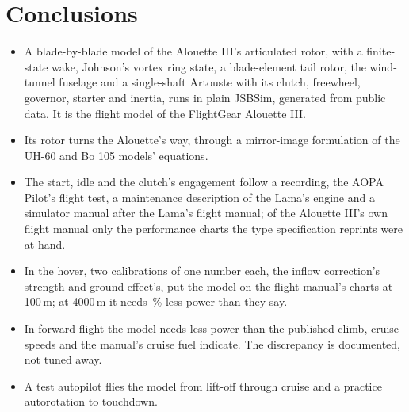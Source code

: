 \documentclass[10pt,a4paper,twocolumn]{article}
\begin{document}
\section{Conclusions}\label{sec:concl}
\begin{itemize}
\item A blade-by-blade model of the Alouette III's articulated rotor, with a finite-state wake, Johnson's vortex ring state, a
blade-element tail rotor, the wind-tunnel fuselage and a single-shaft Artouste with its clutch, freewheel, governor, starter and inertia,
runs in plain JSBSim, generated from public data. It is the flight model of the FlightGear Alouette III.
\item Its rotor turns the Alouette's way, through a mirror-image formulation of the UH-60 and Bo 105 models' equations.
\item The start, idle and the clutch's engagement follow a recording, the AOPA Pilot's flight test, a maintenance description of the
Lama's engine and a simulator manual after the Lama's flight manual; of the Alouette III's own flight manual only the performance charts
the type specification reprints were at hand.
\item In the hover, two calibrations of one number each, the inflow correction's strength and ground effect's, put the model on the
flight manual's charts at 100\,m; at 4000\,m it needs \NWTopPct\,\% less power than they say.
\item In forward flight the model needs less power than the published climb, cruise speeds and the manual's cruise fuel indicate. The
discrepancy is documented, not tuned away.
\item A test autopilot flies the model from lift-off through cruise and a practice autorotation to touchdown.
\end{itemize}
\end{document}
